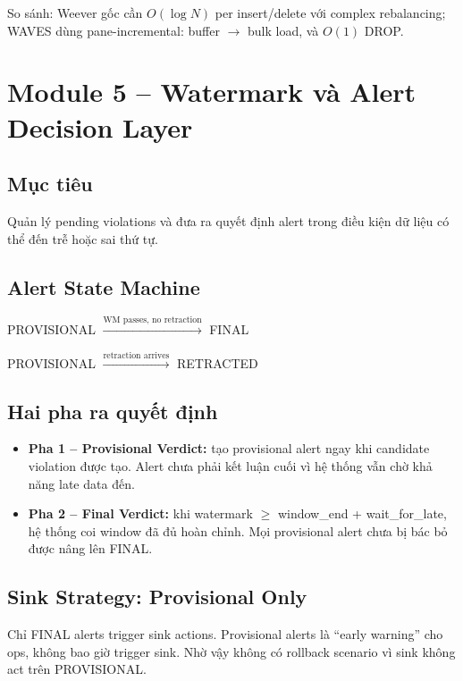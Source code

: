 So sánh: Weever gốc cần $O(\log N)$ per insert/delete với complex rebalancing; WAVES dùng pane-incremental: buffer $\rightarrow$ bulk load, và $O(1)$ DROP.

\section{Module 5 -- Watermark và Alert Decision Layer}

\subsection{Mục tiêu}
Quản lý pending violations và đưa ra quyết định alert trong điều kiện dữ liệu có thể đến trễ hoặc sai thứ tự.

\subsection{Alert State Machine}

\begin{center}
PROVISIONAL $\xrightarrow{\text{WM passes, no retraction}}$ FINAL

PROVISIONAL $\xrightarrow{\text{retraction arrives}}$ RETRACTED
\end{center}

\subsection{Hai pha ra quyết định}

\begin{itemize}
  \item \textbf{Pha 1 -- Provisional Verdict:} tạo provisional alert ngay khi candidate violation được tạo. Alert chưa phải kết luận cuối vì hệ thống vẫn chờ khả năng late data đến.
  \item \textbf{Pha 2 -- Final Verdict:} khi watermark $\geq$ window\_end + wait\_for\_late, hệ thống coi window đã đủ hoàn chỉnh. Mọi provisional alert chưa bị bác bỏ được nâng lên FINAL.
\end{itemize}

\subsection{Sink Strategy: Provisional Only}
Chỉ FINAL alerts trigger sink actions. Provisional alerts là ``early warning'' cho ops, không bao giờ trigger sink. Nhờ vậy không có rollback scenario vì sink không act trên PROVISIONAL.

